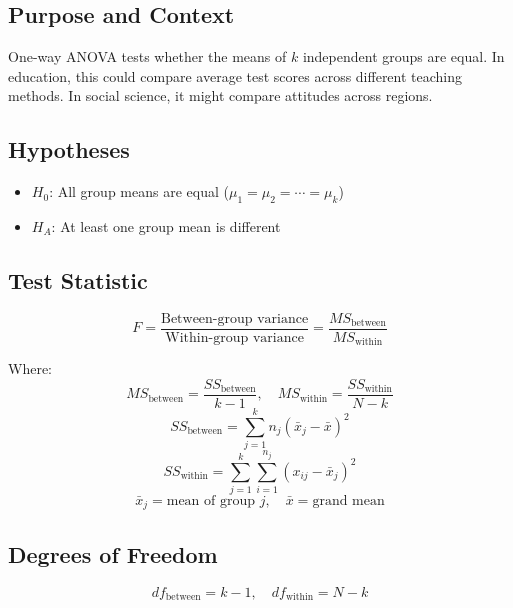 \documentclass[11pt]{article}
\begin{document}
\subsection{Purpose and Context}
One-way ANOVA tests whether the means of $k$ independent groups are equal. In education, this could compare average test scores across different teaching methods. In social science, it might compare attitudes across regions.

\subsection{Hypotheses}

\begin{itemize}
    \item $H_0$: All group means are equal ($\mu_1 = \mu_2 = \cdots = \mu_k$)
    \item $H_A$: At least one group mean is different
\end{itemize}

\subsection{Test Statistic}

\[
F = \frac{\text{Between-group variance}}{\text{Within-group variance}} = \frac{MS_{\text{between}}}{MS_{\text{within}}}
\]

Where:
\[
MS_{\text{between}} = \frac{SS_{\text{between}}}{k-1}, \quad MS_{\text{within}} = \frac{SS_{\text{within}}}{N-k}
\]
\[
SS_{\text{between}} = \sum_{j=1}^k n_j (\bar{x}_j - \bar{x})^2
\]
\[
SS_{\text{within}} = \sum_{j=1}^k \sum_{i=1}^{n_j} (x_{ij} - \bar{x}_j)^2
\]
\[
\bar{x}_j = \text{mean of group } j, \quad \bar{x} = \text{grand mean}
\]

\subsection{Degrees of Freedom}
\[
df_{\text{between}} = k-1, \quad df_{\text{within}} = N-k
\]
\end{document}
